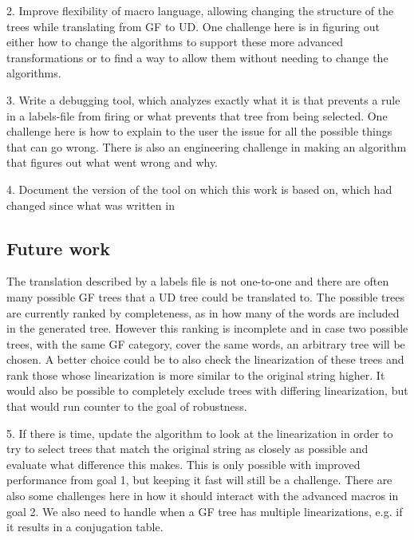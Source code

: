2. Improve flexibility of macro language, allowing changing the structure of the trees while translating from GF to UD. One challenge here is in figuring out either how to change the algorithms to support these more advanced transformations or to find a way to allow them without needing to change the algorithms.

3. Write a debugging tool, which analyzes exactly what it is that prevents a rule in a labels-file from firing or what prevents that tree from being selected.
One challenge here is how to explain to the user the issue for all the possible things that can go wrong.
There is also an engineering challenge in making an algorithm that figures out what went wrong and why.

4. Document the version of the tool on which this work is based on, which had changed since what was written in \cite{kolachina-ranta-2017}


\subsection{Future work}

The translation described by a labels file is not one-to-one and there are often many possible GF trees that a UD tree could be translated to. The possible trees are currently ranked by completeness, as in how many of the words are included in the generated tree. However this ranking is incomplete and in case two possible trees, with the same GF category, cover the same words, an arbitrary tree will be chosen. A better choice could be to also check the linearization of these trees and rank those whose linearization is more similar to the original string higher. It would also be possible to completely exclude trees with differing linearization, but that would run counter to the goal of robustness.


5. If there is time, update the algorithm to look at the linearization in order to try to select trees that match the original string as closely as possible and evaluate what difference this makes. This is only possible with improved performance from goal 1, but keeping it fast will still be a challenge. There are also some challenges here in how it should interact with the advanced macros in goal 2. We also need to handle when a GF tree has multiple linearizations, e.g. if it results in a conjugation table.

